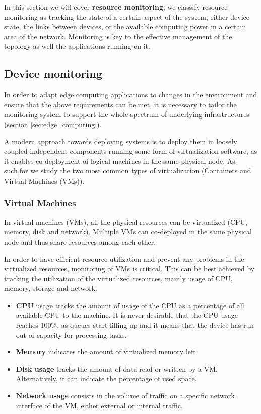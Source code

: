 
In this section we will cover \textbf{resource monitoring}, we classify resource monitoring as tracking the state of a certain aspect of the system, either device state, the links between devices, or the available computing power in a certain area of the network. Monitoring is key to the effective management of the topology as well the applications running on it.

\subsection{Device monitoring}

In order to adapt edge computing applications to changes in the environment and ensure that the above requirements can be met, it is necessary to tailor the monitoring system to support the whole spectrum of underlying infrastructures (section \ref{sec:edge_computing}). 

A modern approach towards deploying systems is to deploy them in loosely coupled independent components running some form of virtualization software, as it enables co-deployment of logical machines in the same physical node. As such,for we study the two most common types of virtualization (Containers and Virtual Machines (VMs)). 

\subsubsection{Virtual Machines}

In virtual machines (VMs), all the physical resources can be virtualized (CPU, memory, disk and network). Multiple VMs can co-deployed in the same physical node and thus share resources among each other. 

In order to have efficient resource utilization and prevent any problems in the virtualized resources, monitoring of VMs is critical. This can be best achieved by tracking the utilization of the virtualized resources, mainly usage of CPU, memory, storage and network.

\begin{itemize}

    \item \textbf{CPU} usage tracks the amount of usage of the CPU as a percentage of all available CPU to the machine. It is never desirable that the CPU usage reaches 100\%, as queues start filling up and it means that the device has run out of capacity for processing tasks.
    
    \item \textbf{Memory} indicates the amount of virtualized memory left.
    
    \item \textbf{Disk usage} tracks the amount of data read or written by a VM. Alternatively, it can indicate the percentage of used space.

    \item \textbf{Network usage} consists in the volume of traffic on a specific network interface of the VM, either external or internal traffic.

\end{itemize}

